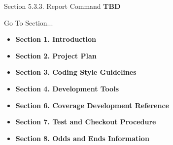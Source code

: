 \begin{Desc}
\item[Section 5.3.3. Report Command]{\bf TBD}  \end{Desc}




\begin{Desc}
\item[Go To Section...]\begin{itemize}
\item {\bf Section 1.  Introduction} \item {\bf Section 2.  Project Plan} \item {\bf Section 3.  Coding Style Guidelines} \item {\bf Section 4.  Development Tools} \item {\bf Section 6.  Coverage Development Reference} \item {\bf Section 7.  Test and Checkout Procedure} \item {\bf Section 8.  Odds and Ends Information} \end{itemize}
\end{Desc}
